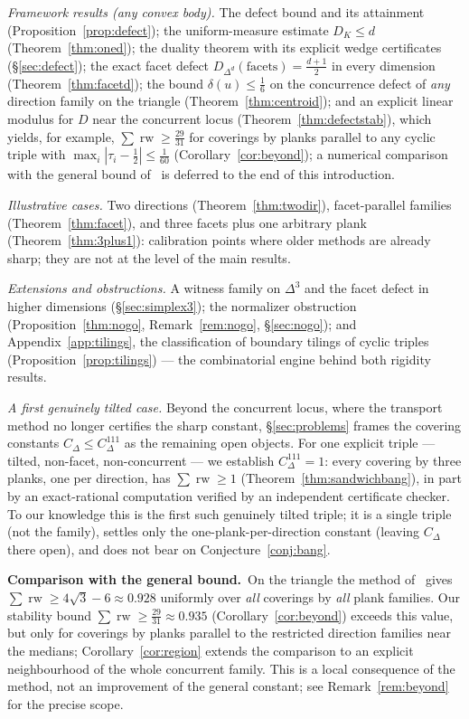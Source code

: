 \documentclass[11pt,reqno]{amsart}
\theoremstyle{plain}
\theoremstyle{definition}
\theoremstyle{remark}
\newcommand{\rw}{\operatorname{rw}}
\begin{document}
\emph{Framework results (any convex body).} The defect bound and its
attainment (Proposition~\ref{prop:defect}); the uniform-measure estimate
$D_K\le d$ (Theorem~\ref{thm:oned}); the duality theorem with its explicit
wedge certificates (\S\ref{sec:defect}); the exact facet defect
$D_{\Delta^d}(\text{facets})=\tfrac{d+1}2$ in every dimension
(Theorem~\ref{thm:facetd}); the bound $\delta(u)\le\tfrac16$ on the concurrence
defect of \emph{any} direction family on the triangle
(Theorem~\ref{thm:centroid}); and an explicit linear modulus for $D$ near the
concurrent locus (Theorem~\ref{thm:defectstab}), which yields, for example,
$\sum\rw\ge\tfrac{29}{31}$ for coverings by planks parallel to any
cyclic triple with $\max_i|\tau_i-\tfrac12|\le\tfrac1{60}$
(Corollary~\ref{cor:beyond}); a numerical comparison with the general bound
of~\cite{BY26} is deferred to the end of this introduction.

\emph{Illustrative cases.} Two directions (Theorem~\ref{thm:twodir}),
facet-parallel families (Theorem~\ref{thm:facet}), and three facets plus one
arbitrary plank (Theorem~\ref{thm:3plus1}): calibration points where older
methods are already sharp; they are not at the level of the main results.

\emph{Extensions and obstructions.} A witness family on $\Delta^3$ and the
facet defect in higher dimensions (\S\ref{sec:simplex3}); the normalizer
obstruction (Proposition~\ref{thm:nogo}, Remark~\ref{rem:nogo},
\S\ref{sec:nogo}); and Appendix~\ref{app:tilings}, the classification of
boundary tilings of cyclic triples (Proposition~\ref{prop:tilings}) --- the
combinatorial engine behind both rigidity results.

\emph{A first genuinely tilted case.} Beyond the concurrent locus, where the
transport method no longer certifies the sharp constant, \S\ref{sec:problems}
frames the covering constants $C_\Delta\le C^{111}_\Delta$ as the remaining
open objects. For one explicit triple --- tilted, non-facet, non-concurrent ---
we establish $C^{111}_\Delta=1$: every covering by three planks, one per
direction, has $\sum\rw\ge1$ (Theorem~\ref{thm:sandwichbang}), in part by an
exact-rational computation verified by an independent certificate checker. To
our knowledge this is the first such genuinely tilted triple; it is a single
triple (not the family), settles only the one-plank-per-direction constant
(leaving $C_\Delta$ there open), and does not bear on
Conjecture~\ref{conj:bang}.

\smallskip
\noindent\textbf{Comparison with the general bound.}\ On the triangle the
method of~\cite{BY26} gives $\sum\rw\ge4\sqrt3-6\approx0.928$ uniformly over
\emph{all} coverings by \emph{all} plank families. Our stability bound
$\sum\rw\ge\tfrac{29}{31}\approx0.935$ (Corollary~\ref{cor:beyond}) exceeds
this value, but only for coverings by planks parallel to the restricted
direction families near the medians; Corollary~\ref{cor:region} extends the
comparison to an explicit neighbourhood of the whole concurrent family. This
is a local consequence of the method, not an improvement of the general
constant; see Remark~\ref{rem:beyond} for the precise scope.
\end{document}
